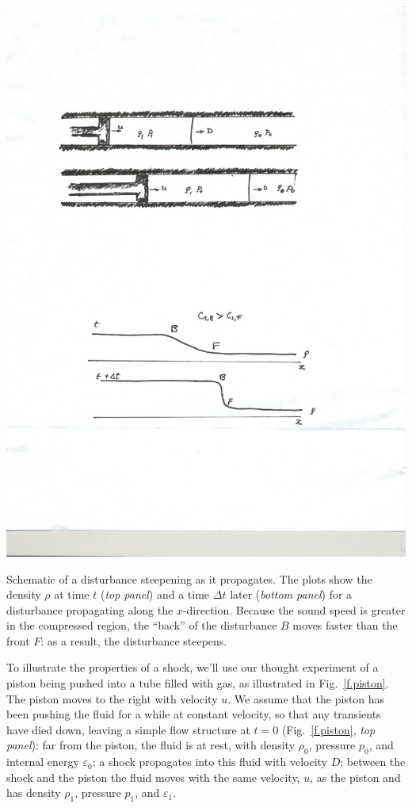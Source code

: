 \begin{marginfigure}
\includegraphics[width=\textwidth]{shock-formation}
\caption[Schematic of a disturbance steepening as it propagates.]{Schematic of a disturbance steepening as it propagates.  The plots show the density $\rho$ at time $t$ (\emph{top panel}) and a time $\Delta t$ later (\emph{bottom panel}) for a disturbance propagating along the $x$-direction.  Because the sound speed is greater in the compressed region, the ``back'' of the disturbance $B$ moves faster than the front $F$: as a result, the disturbance steepens. }
\label{f.steepening}
\end{marginfigure}

To illustrate the properties of a shock, we'll use our thought experiment of a piston being pushed into a tube filled with gas, as illustrated in Fig.~\ref{f.piston}.  The piston moves to the right with velocity $u$.  We assume that the piston has been pushing the fluid for a while at constant velocity, so that any transients have died down, leaving a simple flow structure at $t=0$ (Fig.~\ref{f.piston}, \emph{top panel}): far from the piston, the fluid is at rest, with density $\rho_{0}$, pressure $p_{0}$, and internal energy $\varepsilon_{0}$; a shock propagates into this fluid with velocity $D$; between the shock and the piston the fluid moves with the same velocity, $u$, as the piston and has density $\rho_{1}$, pressure $p_{1}$, and $\varepsilon_{1}$.

